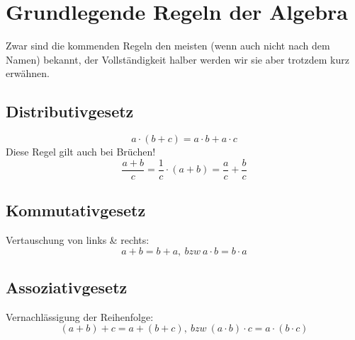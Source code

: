 \section{Grundlegende Regeln der Algebra}
	Zwar sind die kommenden Regeln den meisten (wenn auch nicht nach dem Namen)
	bekannt, der Vollständigkeit halber werden wir sie aber trotzdem kurz erwähnen.
	
	\subsection{Distributivgesetz}
		\[a\cdot (b+c)=a\cdot b+a\cdot c\]
		Diese Regel gilt auch bei Brüchen!
		\[\frac{a+b}{c}=\frac{1}{c}\cdot (a+b)=\frac{a}{c}+\frac{b}{c}\]
	
	\subsection{Kommutativgesetz}
		Vertauschung von links \& rechts:
		\[a+b=b+a,\ bzw\ a\cdot b=b\cdot a\]
	
	\subsection{Assoziativgesetz}
		Vernachlässigung der Reihenfolge:
		\[(a+b)+c=a+(b+c),\ bzw\ (a\cdot b)\cdot c=a\cdot (b\cdot c)\]